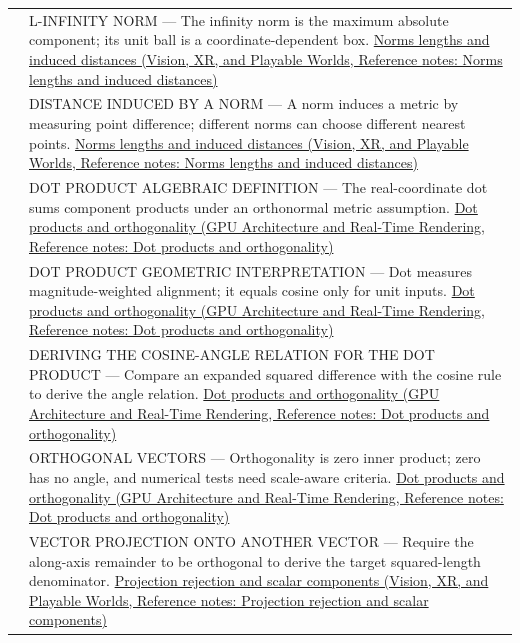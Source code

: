 {\begin{longtable}[]{@{}
  >{\raggedright\arraybackslash}p{}
  >{\raggedright\arraybackslash}p{}@{}}
532 & L-INFINITY NORM --- The infinity norm is the maximum absolute component; its unit ball is a coordinate-dependent box. \href{../07-Vision-XR-and-Playable-Worlds/main.pdf\#nameddest=appendix-49933872bb51}{Norms lengths and induced distances (Vision, XR, and Playable Worlds, Reference notes: Norms lengths and induced distances)} \\
533 & DISTANCE INDUCED BY A NORM --- A norm induces a metric by measuring point difference; different norms can choose different nearest points. \href{../07-Vision-XR-and-Playable-Worlds/main.pdf\#nameddest=appendix-49933872bb51}{Norms lengths and induced distances (Vision, XR, and Playable Worlds, Reference notes: Norms lengths and induced distances)} \\
534 & DOT PRODUCT ALGEBRAIC DEFINITION --- The real-coordinate dot sums component products under an orthonormal metric assumption. \href{../06-GPU-Architecture-and-Real-Time-Rendering/main.pdf\#nameddest=appendix-8bc4e8fc547c}{Dot products and orthogonality (GPU Architecture and Real-Time Rendering, Reference notes: Dot products and orthogonality)} \\
535 & DOT PRODUCT GEOMETRIC INTERPRETATION --- Dot measures magnitude-weighted alignment; it equals cosine only for unit inputs. \href{../06-GPU-Architecture-and-Real-Time-Rendering/main.pdf\#nameddest=appendix-8bc4e8fc547c}{Dot products and orthogonality (GPU Architecture and Real-Time Rendering, Reference notes: Dot products and orthogonality)} \\
536 & DERIVING THE COSINE-ANGLE RELATION FOR THE DOT PRODUCT --- Compare an expanded squared difference with the cosine rule to derive the angle relation. \href{../06-GPU-Architecture-and-Real-Time-Rendering/main.pdf\#nameddest=appendix-8bc4e8fc547c}{Dot products and orthogonality (GPU Architecture and Real-Time Rendering, Reference notes: Dot products and orthogonality)} \\
537 & ORTHOGONAL VECTORS --- Orthogonality is zero inner product; zero has no angle, and numerical tests need scale-aware criteria. \href{../06-GPU-Architecture-and-Real-Time-Rendering/main.pdf\#nameddest=appendix-8bc4e8fc547c}{Dot products and orthogonality (GPU Architecture and Real-Time Rendering, Reference notes: Dot products and orthogonality)} \\
538 & VECTOR PROJECTION ONTO ANOTHER VECTOR --- Require the along-axis remainder to be orthogonal to derive the target squared-length denominator. \href{../07-Vision-XR-and-Playable-Worlds/main.pdf\#nameddest=appendix-505a502c372a}{Projection rejection and scalar components (Vision, XR, and Playable Worlds, Reference notes: Projection rejection and scalar components)} \\

\end{longtable}}
